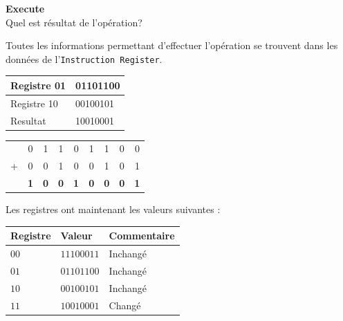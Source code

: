 \begin{Exercice}[10 minutes] \textbf{Execute}\\
    Quel est résultat de l'opération?
    \begin{conseil}
        Toutes les informations permettant d'effectuer l'opération se trouvent dans les données de l'\lstinline{Instruction Register}.
    \end{conseil}
    \begin{solution}

    \begin{tabular}{| C{0.13\textwidth} | C{0.13\textwidth} |} 
        \hline
        Registre 01 & 01101100\\ [0.5ex] 
        \hline
        Registre 10 & 00100101\\ [0.5ex] 
        \hline
        Resultat & 10010001\\ [0.5ex] 
        \hline

    \end{tabular}
        \begin{tabular}{ccccccccc}
            & 0 & 1 & 1 & 0 & 1 & 1 & 0 & 0 \\
          + & 0 & 0 & 1 & 0 & 0 & 1 & 0 & 1 \\
          \hline
            & \textbf{1} & \textbf{0} & \textbf{0} & \textbf{1} & \textbf{0} & \textbf{0} & \textbf{0} & \textbf{1} \\
          \end{tabular}

    \medskip
    Les registres ont maintenant les valeurs suivantes : 
    \medskip
    \begin{tabular}{| C{0.13\textwidth} | C{0.13\textwidth} | C{0.13\textwidth}|} 
    \hline
    \textbf{Registre} & \textbf{Valeur} & \textbf{Commentaire} \\ [1ex]
    \hline
    $00$ & $11100011$ & Inchangé\\ [0.5ex] 
    \hline
    $01$ & $01101100$ & Inchangé\\ [0.5ex] 
    \hline
    $10$ & $00100101$ & Inchangé\\ [0.5ex] 
    \hline
    $11$ & $10010001$ & Changé\\ [0.5ex]
    \hline
    \end{tabular}
    \end{solution}
\end{Exercice}



